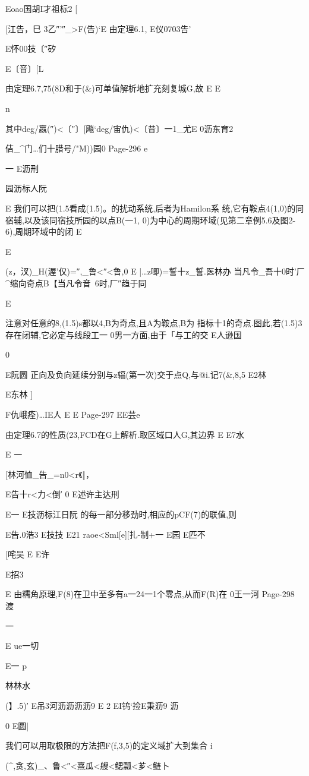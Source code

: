 {{{{{{{{{{{{{{Eoao国胡I才祖标2
[

[江告，巳
3乙″'″_>F(告)`E
由定理6.1,
E仪0703告'

E怀00技〔″矽

E〔音〕[L

由定理6.7,75(8D和于(&)可单值解析地扩充刻复城G,故
E
E

n

其中deg/嬴(″)<〔″〕[飚`deg/宙仇)<〔昔〕一1_尤E
0沥东育2

佶_^门…们十腊号/"M))园0
Page-296
e

一
E沥刑

园沥标人阮

E
我们可以把(1.5看成(1.5)。的扰动系统,后者为Hamilon系
统,它有鞍点4(1,0)的同宿辅,以及该同宿技所园的以点B(一1,
0)为中心的周期环域(见第二章例5.6及图2-6),周期环域中的闭
E

E{(z，汊)_H(渥'仅)=″,_鲁<″<鲁,0
E
|…z唧)=誓十z_誓.医林办
当凡令_吾十0时'厂^缩向奇点B【当凡令音~6时,厂″趋于同

E

注意对任意的8,(1.5)s都以4,B为奇点,且A为鞍点,B为
指标十1的奇点.图此,若(1.5)3存在闭辅,它必定与线段工一
0男一方面,由于「与工的交
E人逊国

0

E阮圆
正向及负向延续分别与z辐(第一次)交于点Q,与@i.记7(&,8,5
E2林

E东林
]

F仇峨痊)…IE人
E
E
Page-297
EE芸e

由定理6.7的性质(23,FCD在G上解析.取区域口人G,其边界
E
E7水

E
一

[林河恤_告_=n0<r《‖，

E告十r<力<倒′
0
E述许主达刑

E一
E技沥标江日阮
的每一部分移劲时,相应的pCF(7)的联值,则

E告.0浩3
E技技
E21
raoe<Sml[e][扎-制+一
E园
E匹不

[咤吴
E
E许

E招3

E
由糯角原理,F(8)在卫中至多有a一24一1个零点,从而F(R)在
0王一河
Page-298
渡

一

E
ue一切

E一
p

林林水

(】.5)′
E吊3河沥沥沥沥9
E
2
EI钨`捡E秉沥9
沥

0
E圆|

我们可以用取极限的方法把F(f,3,5)的定义域扩大到集合
i{(^,贪,玄)_、鲁<″<熹瓜<艘<鳃瓢<芗<鲢卜

}}}}}}}}}}}}}}}}
